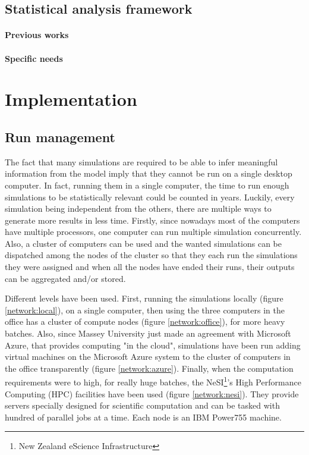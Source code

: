 \documentclass[a4paper,12pt]{report}
\begin{document}
\section{Statistical analysis framework}

\subsubsection{Previous works}
\subsubsection{Specific needs}


\chapter{Implementation}

\section{Run management}
The fact that many simulations are required to be able to infer meaningful information from the model imply that they cannot be run on a single desktop computer. In fact, running them in a single computer, the time to run enough simulations to be statistically relevant could be counted in years.
Luckily, every simulation being independent from the others, there are multiple ways to generate more results in less time.
Firstly, since nowadays most of the computers have multiple processors, one computer can run multiple simulation concurrently. Also, a cluster of computers can be used and the wanted simulations can be dispatched among the nodes of the cluster so that they each run the simulations they were assigned and when all the nodes have ended their runs, their outputs can be aggregated and/or stored.

Different levels have been used. First, running the simulations locally (figure \ref{network:local}), on a single computer, then using the three computers in the office has a cluster of compute nodes (figure \ref{network:office}), for more heavy batches. Also, since Massey University just made an agreement with Microsoft Azure, that provides computing "in the cloud", simulations have been run adding virtual machines on the Microsoft Azure system to the cluster of computers in the office transparently (figure \ref{network:azure}).
Finally, when the computation requirements were to high, for really huge batches, the NeSI\footnote{New Zealand eScience Infrastructure}'s High Performance Computing (HPC) facilities have been used (figure \ref{network:nesi}). They provide servers specially designed for scientific computation and can be tasked with hundred of parallel jobs at a time. Each node is an IBM Power755 machine.
\end{document}
